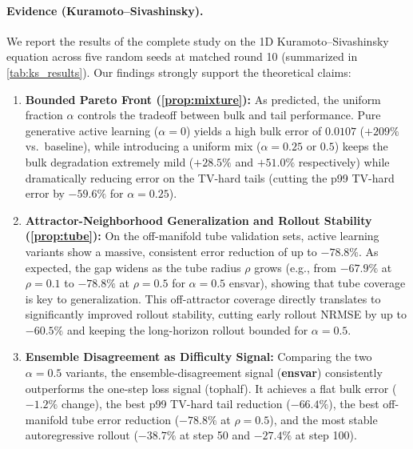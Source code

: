 \documentclass{article}
\theoremstyle{plain}
\theoremstyle{definition}
\theoremstyle{remark}
\newcommand{\unif}{\alpha}
\begin{document}
\paragraph{Evidence (Kuramoto--Sivashinsky).}
We report the results of the complete study on the 1D Kuramoto--Sivashinsky equation across five random seeds at matched round 10 (summarized in \cref{tab:ks_results}).
Our findings strongly support the theoretical claims:
\begin{enumerate}
  \item \textbf{Bounded Pareto Front (\cref{prop:mixture}):} As predicted, the uniform fraction $\unif$ controls the tradeoff between bulk and tail performance. Pure generative active learning ($\unif{=}0$) yields a high bulk error of $0.0107$ ($+209\%$ vs.\ baseline), while introducing a uniform mix ($\unif{=}0.25$ or $0.5$) keeps the bulk degradation extremely mild ($+28.5\%$ and $+51.0\%$ respectively) while dramatically reducing error on the TV-hard tails (cutting the p99 TV-hard error by $-59.6\%$ for $\unif{=}0.25$).
  \item \textbf{Attractor-Neighborhood Generalization and Rollout Stability (\cref{prop:tube}):} On the off-manifold tube validation sets, active learning variants show a massive, consistent error reduction of up to $-78.8\%$. As expected, the gap widens as the tube radius $\rho$ grows (e.g., from $-67.9\%$ at $\rho{=}0.1$ to $-78.8\%$ at $\rho{=}0.5$ for $\unif{=}0.5$ \textsf{ensvar}), showing that tube coverage is key to generalization. This off-attractor coverage directly translates to significantly improved rollout stability, cutting early rollout NRMSE by up to $-60.5\%$ and keeping the long-horizon rollout bounded for $\unif{=}0.5$.
  \item \textbf{Ensemble Disagreement as Difficulty Signal:} Comparing the two $\unif{=}0.5$ variants, the ensemble-disagreement signal (\textbf{\textsf{ensvar}}) consistently outperforms the one-step loss signal (\textsf{tophalf}). It achieves a flat bulk error ($-1.2\%$ change), the best p99 TV-hard tail reduction ($-66.4\%$), the best off-manifold tube error reduction ($-78.8\%$ at $\rho{=}0.5$), and the most stable autoregressive rollout ($-38.7\%$ at step 50 and $-27.4\%$ at step 100).
\end{enumerate}

\end{document}
